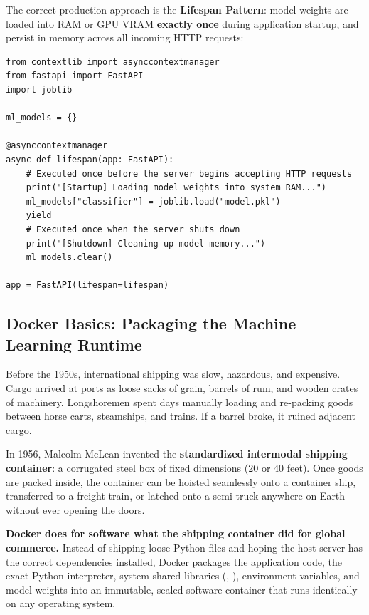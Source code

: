 The correct production approach is the \textbf{Lifespan Pattern}: model weights are loaded into RAM or GPU VRAM \textbf{exactly once} during application startup, and persist in memory across all incoming HTTP requests:
\begin{lstlisting}[style=pythonstyle, numbers=none]
from contextlib import asynccontextmanager
from fastapi import FastAPI
import joblib

ml_models = {}

@asynccontextmanager
async def lifespan(app: FastAPI):
    # Executed once before the server begins accepting HTTP requests
    print("[Startup] Loading model weights into system RAM...")
    ml_models["classifier"] = joblib.load("model.pkl")
    yield
    # Executed once when the server shuts down
    print("[Shutdown] Cleaning up model memory...")
    ml_models.clear()

app = FastAPI(lifespan=lifespan)
\end{lstlisting}

\subsection{Docker Basics: Packaging the Machine Learning Runtime}\label{subsec:docker_basics}

\begin{analogy}
Before the 1950s, international shipping was slow, hazardous, and expensive. Cargo arrived at ports as loose sacks of grain, barrels of rum, and wooden crates of machinery. Longshoremen spent days manually loading and re-packing goods between horse carts, steamships, and trains. If a barrel broke, it ruined adjacent cargo.

In 1956, Malcolm McLean invented the \textbf{standardized intermodal shipping container}: a corrugated steel box of fixed dimensions ($20$ or $40$ feet). Once goods are packed inside, the container can be hoisted seamlessly onto a container ship, transferred to a freight train, or latched onto a semi-truck anywhere on Earth without ever opening the doors.

\textbf{Docker does for software what the shipping container did for global commerce.} Instead of shipping loose Python files and hoping the host server has the correct dependencies installed, Docker packages the application code, the exact Python interpreter, system shared libraries (, ), environment variables, and model weights into an immutable, sealed software container that runs identically on any operating system.
\end{analogy}

